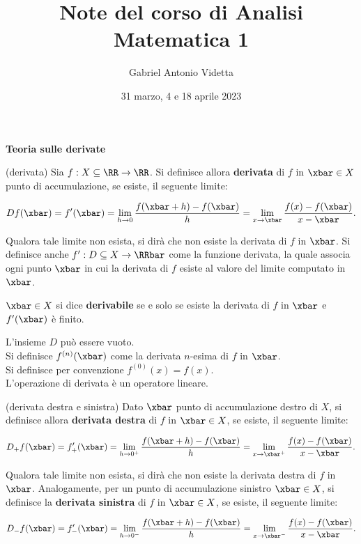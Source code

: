 \documentclass[11pt]{article}
\title{\textbf{Note del corso di Analisi Matematica 1}}
\author{Gabriel Antonio Videtta}
\date{31 marzo, 4 e 18 aprile 2023}
\begin{document}
	
	\maketitle
	
	\begin{center}
		\Large \textbf{Teoria sulle derivate}
	\end{center}

	\begin{definition} (derivata)
		Sia $f : X \subseteq \RR \to \RR$. Si definisce allora \textbf{derivata}
		di $f$ in $\xbar \in X$ punto di accumulazione, se esiste, il seguente limite:
		
		\[Df(\xbar) = f'(\xbar) = \lim_{h \to 0} \frac{f(\xbar + h) - f(\xbar)}{h} = \lim_{x \to \xbar} \frac{f(x) - f(\xbar)}{x - \xbar}.\]
		
		\vskip 0.05in
		
		Qualora tale limite non esista, si dirà che non esiste la derivata
		di $f$ in $\xbar$. Si definisce anche $f' : D \subseteq X \to \RRbar$ come la funzione derivata,
		la quale associa ogni punto $\xbar$ in cui la derivata di $f$ esiste al
		valore del limite computato in $\xbar$.
	\end{definition}
	
	\begin{definition}
		$\xbar \in X$ si dice \textbf{derivabile} se e solo se esiste la
		derivata di $f$ in $\xbar$ e $f'(\xbar)$ è finito.
	\end{definition}
	
	\begin{remark}\nl
		\li L'insieme $D$ può essere vuoto. \\
		\li Si definisce $f^{(n)}(\xbar)$ come la derivata $n$-esima
		di $f$ in $\xbar$. \\
		\li Si definisce per convenzione $f^{(0)}(x) = f(x)$. \\
		\li L'operazione di derivata è un operatore lineare. \\
	\end{remark}

	\begin{definition} (derivata destra e sinistra)
		Dato $\xbar$ punto di accumulazione destro di $X$, si definisce
		allora \textbf{derivata destra} di $f$ in $\xbar \in X$, se
		esiste, il seguente limite:
		
		\[D_+ f(\xbar) = f_+'(\xbar) = \lim_{h \to 0^+} \frac{f(\xbar + h) - f(\xbar)}{h} = \lim_{x \to \xbar^+} \frac{f(x) - f(\xbar)}{x - \xbar}.\]
		
		\vskip 0.05in
		
		Qualora tale limite non esista, si dirà che non esiste la derivata destra di $f$ in $\xbar$. Analogamente, per un punto di accumulazione sinistro $\xbar \in X$, si definisce
		la \textbf{derivata sinistra} di $f$ in $\xbar \in X$, se esiste, il seguente
		limite:
		
		\[D_- f(\xbar) = f_-'(\xbar) = \lim_{h \to 0^-} \frac{f(\xbar + h) - f(\xbar)}{h} = \lim_{x \to \xbar^-} \frac{f(x) - f(\xbar)}{x - \xbar}.\]
	\end{definition}
\end{document}
